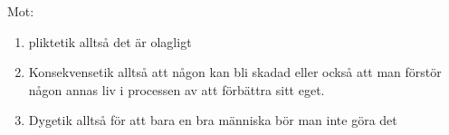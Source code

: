 \documentclass[12pt]{article}
\begin{document}
    \vspace{1cm}

    Mot:

    \begin{enumerate}    
        
        \item pliktetik alltså det är olagligt
        \item Konsekvensetik alltså att någon kan bli skadad eller också att man förstör någon annas liv i processen av att förbättra sitt eget.
        \item Dygetik alltså för att bara en bra människa bör man inte göra det
    \end{enumerate}

   
\end{document}
